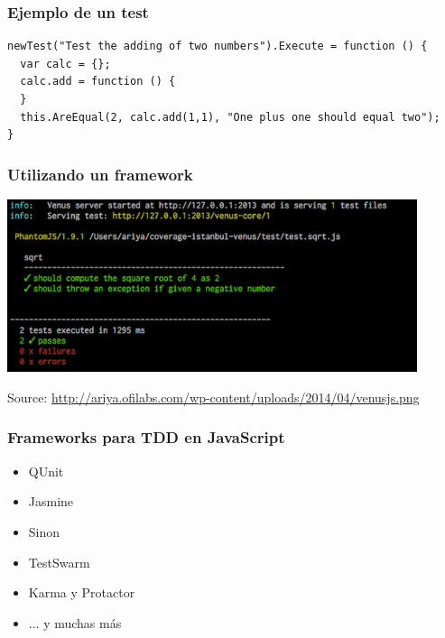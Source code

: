 
\begin{frame}[fragile]
\frametitle{Ejemplo de un test}


\begin{footnotesize}
\begin{verbatim}
newTest("Test the adding of two numbers").Execute = function () {
  var calc = {};
  calc.add = function () {
  }
  this.AreEqual(2, calc.add(1,1), "One plus one should equal two");
}
\end{verbatim}
\end{footnotesize}

\end{frame}


\begin{frame}
\frametitle{Utilizando un framework}

\begin{center}
  \includegraphics[width=12cm]{figs/venusjs.png}
\end{center}


\begin{flushright}
{\tiny
Source: \url{http://ariya.ofilabs.com/wp-content/uploads/2014/04/venusjs.png}
}
\end{flushright}

\end{frame}




\begin{frame}
\frametitle{Frameworks para TDD en JavaScript}

\begin{itemize}
   \item QUnit 
   \item Jasmine
   \item Sinon
   \item TestSwarm
   \item Karma y Protactor
   \item ... y muchas más
\end{itemize}

\end{frame}

